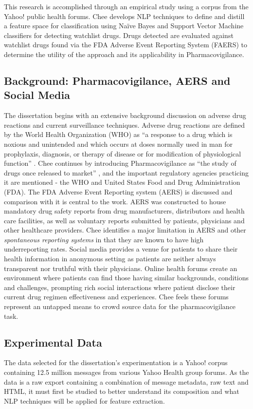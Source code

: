 \documentclass[twoside,11pt]{article}
\begin{document}
This research is accomplished through an empirical study using a corpus from the
Yahoo! public health forums. Chee develops NLP techniques to define and distill a feature space for classification using Na\"ive Bayes and
Support Vector Machine classifiers for detecting watchlist drugs. Drugs detected are evaluated against watchlist drugs found via the FDA Adverse Event Reporting System (FAERS) to determine the utility of the approach and its applicability in Pharmacovigilance. %

\subsection{Background: Pharmacovigilance, AERS and Social Media}
The dissertation begins with an extensive background discussion on adverse drug reactions and current surveillance techniques. Adverse drug reactions are defined by the World Health Organization (WHO) as ``a response to a drug which is noxious and unintended and which occurs at doses normally used in man for prophylaxis, diagnosis, or therapy of disease or for modification of physiological function'' \cite{WHO}. Chee continues by introducing Pharmacovigilance as ``the study of drugs once released to market'' \citep{Chee}, and the important regulatory agencies practicing it are mentioned - the WHO and United States Food and Drug Administration (FDA). The FDA Adverse Event Reporting system (AERS) is discussed and comparison with it is central to the work. AERS was constructed to house mandatory drug safety reports from drug manufacturers, distributors and health care facilities, as well as voluntary reports submitted by patients, physicians and other healthcare providers.
Chee identifies a major limitation in AERS and other \textit{spontaneous reporting systems} in that they are known to have high underreporting rates. Social media provides a venue for patients to share their health information in anonymous setting as patients are neither always transparent nor truthful with their physicians. Online health forums create an environment where patients can find those having similar backgrounds, conditions and challenges, prompting rich social interactions where patient disclose their current drug regimen effectiveness and experiences. Chee feels these forums represent an untapped means to crowd source data for the pharmacovigilance task. %

\subsection{Experimental Data}
The data selected for the dissertation's experimentation is a Yahoo! corpus containing 12.5 million messages from various Yahoo Health group forums. As the data is a raw export containing a combination of message metadata, raw text and HTML, it must first be studied to better understand its composition and what NLP techniques will be applied for feature extraction. %
\end{document}
